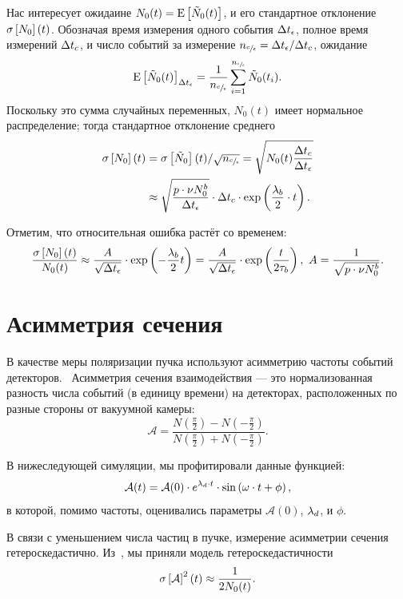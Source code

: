 Нас интересует ожидаине $N_0(t) = \Xpct{\tilde{N}_0(t)}$, и его
стандартное отклонение $\SD{N_0}(t)$. Обозначая время измерения одного
события $\Delta t_{\epsilon}$, полное время измерений $\Delta t_{c}$, и число событий за
измерение ${n_{\sfrac{c}{\epsilon}}} = \Delta t_{\epsilon}/\Delta t_{c}$, ожидание
\begin{equation*}
\Xpct{\tilde{N}_0(t)}_{\dtm} = \frac{1}{\Ncm}\sum_{i=1}^\Ncm \tilde{N}_0(t_i).
\end{equation*}
Поскольку это сумма случайных переменных, $N_0(t)$ имеет нормальное
распределение; тогда стандартное отклонение среднего %
\begin{align*}
\SD{N_0}(t) & = \SD{\tilde{N}_0}(t)/\sqrt{\Ncm} = \sqrt{N_0(t)\frac{\dtc}{\dtm}}            \\
& \approx \sqrt{\frac{p\cdot\nu N_0^b}{\dtm}}\cdot\dtc \cdot\exp\bkt{\frac{\lamb}{2}\cdot t}.
\end{align*}
\newcommand{\Acoef}{\frac{1}{\sqrt{p\cdot\nu N_0^b}}}

Отметим, что относительная ошибка растёт со временем:
\begin{equation}\label{eq:MeasRelErr}
\frac{\SD{N_0}(t)}{N_0(t)} \approx \frac{A}{\sqrt{\dtm}}\cdot\exp\bkt{-\frac{\lamb}{2}t} = \frac{A}{\sqrt{\dtm}}\cdot\exp\bkt{\frac{t}{2\LTb}},~ A=\Acoef.
\end{equation}

\section{Асимметрия сечения}
\newcommand{\Asym}{\mathcal{A}}
В качестве меры поляризации пучка используют асимметрию частоты
событий детекторов.~\cite[стр.~17]{Eversmann:Thesis} Асимметрия сечения
взаимодействия --- это нормализованная разность числа событий (в
единицу времени) на
детекторах, расположенных по разные стороны от вакуумной камеры:
\begin{equation}\label{eq:AsymDef}
\Asym = \frac{N(\frac\pi2) - N(-\frac\pi2)}{N(\frac\pi2)+N(-\frac\pi2)}.
\end{equation}

В нижеследующей симуляции, мы профитировали данные функцией:
\begin{equation}\label{eq:xFOM}
\Asym(t) = \Asym(0)\cdot e^{\lamd\cdot t}\cdot\sin\bkt{\w\cdot t + \phi},
\end{equation}
в которой, помимо частоты, оценивались параметры $\Asym(0)$, $\lambda_d$, и $\phi$. 

В связи с уменьшением числа частиц в пучке, измерение асимметрии
сечения гетероскедастично. Из~\cite[стр.~18]{Eversmann:Thesis}, мы приняли
модель гетероскедастичности
\begin{equation}\label{eq:AsymHtsk}
\SD{\Asym}^2(t) \approx \frac{1}{2N_0(t)}.
\end{equation}

